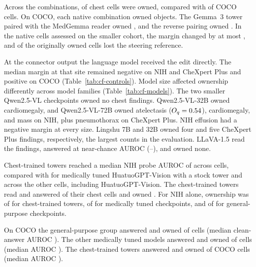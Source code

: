 Across the \cfSwapCombos{} combinations, \cfSwapChestOwned{} of \cfSwapChestCells{} chest cells were owned, compared with \cfSwapCocoOwned{} of \cfSwapCocoCells{} COCO cells. On COCO, each native combination owned \cfSwapCocoNativeMin{} objects. The Gemma~3 tower paired with the MedGemma reader owned \cfSwapCocoGemmaTowerCross{}, and the reverse pairing owned \cfSwapCocoMedTowerCross{}. In the \cfSwapNativeCells{} native cells assessed on the smaller cohort, the margin changed by at most \cfSwapNativeMaxDO{}, and \cfSwapNativeLostReference{} of the \cfSwapNativeOwnedFull{} originally owned cells lost the steering reference.

At the connector output the language model received the edit directly. The median margin at that site remained negative on NIH and CheXpert Plus and positive on COCO (Table~\ref{tab:cf-controls}). Model size affected ownership differently across model families (Table~\ref{tab:cf-models}). The two smaller Qwen2.5-VL checkpoints owned no chest findings. Qwen2.5-VL-32B owned cardiomegaly, and Qwen2.5-VL-72B owned atelectasis ($O_q=0.54$), cardiomegaly, and mass on NIH, plus pneumothorax on CheXpert Plus. NIH effusion had a negative margin at every size. Lingshu 7B and 32B owned four and five CheXpert Plus findings, respectively, the largest counts in the evaluation. LLaVA-1.5 read the findings, answered at near-chance AUROC (\jnLlavaReadAurocMin{}--\jnLlavaReadAurocMax{}), and owned none.


Chest-trained towers reached a median NIH probe AUROC of \cfSpecTowerProbeAuroc{} across \cfSpecTowerProbeN{} cells, compared with \cfSpecStockProbeAuroc{} for medically tuned HuatuoGPT-Vision with a stock tower and \cfSpecRestProbeAuroc{} across the other \cfSpecRestProbeN{} cells, including HuatuoGPT-Vision. The chest-trained towers read \cfSpecTowerReadable{} and answered \cfSpecTowerAnswerable{} of their \cfSpecTowerN{} chest cells and owned \cfSpecTowerOwned{}. For NIH alone, ownership was \cfSpecNihTowerOwned{} of \cfSpecNihTowerN{} for chest-trained towers, \cfSpecNihMedOwned{} of \cfSpecNihMedN{} for medically tuned checkpoints, and \cfSpecNihGenOwned{} of \cfSpecNihGenN{} for general-purpose checkpoints.

On COCO the general-purpose group answered \cfSpecGenCocoAnswerable{} and owned \cfSpecGenCocoOwned{} of \cfSpecGenCocoN{} cells (median clean-answer AUROC \cfSpecGenCocoAnsAuroc{}). The other medically tuned models answered \cfSpecMedCocoAnswerable{} and owned \cfSpecMedCocoOwned{} of \cfSpecMedCocoN{} cells (median AUROC \cfSpecMedCocoAnsAuroc{}). The chest-trained towers answered \cfSpecTowerCocoAnswerable{} and owned \cfSpecTowerCocoOwned{} of \cfSpecTowerCocoN{} COCO cells (median AUROC \cfSpecTowerCocoAnsAuroc{}).

